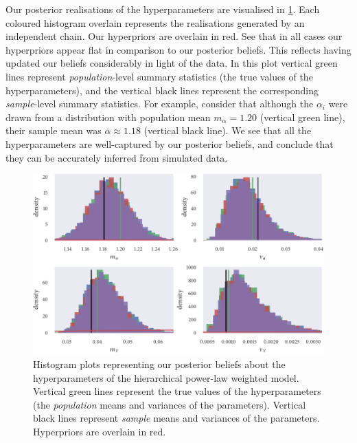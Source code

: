 Our posterior realisations of the hyperparameters are visualised in
\cref{fig:power_hier_hist}. Each coloured histogram overlain represents the
realisations generated by an independent chain. Our hyperpriors are overlain in red. See
that in all cases our hyperpriors appear flat in comparison to our posterior beliefs. This
reflects having updated our beliefs considerably in light of the data.  In this plot
vertical green lines represent \emph{population}-level summary statistics (the true values
of the hyperparameters), and the vertical black lines represent the corresponding
\emph{sample}-level summary statistics. For example, consider that although the $\alpha_i$
were drawn from a distribution with population mean $m_{\alpha}=1.20$ (vertical green
line), their sample mean was $\overline{\alpha}\approx1.18$ (vertical black line).  We see
that all the hyperparameters are well-captured by our posterior beliefs, and conclude that
they can be accurately inferred from simulated data.

\begin{figure}[tbp]
  \includegraphics{power_hier_hist.pdf}
  \caption{Histogram plots representing our posterior beliefs about the hyperparameters of
    the hierarchical power-law weighted model. Vertical green lines represent the
    true values of the hyperparameters (the \emph{population} means and variances of the
    parameters). Vertical black lines represent \emph{sample} means and variances
    of the parameters. Hyperpriors are overlain in red.}
  \label{fig:power_hier_hist}
\end{figure}

